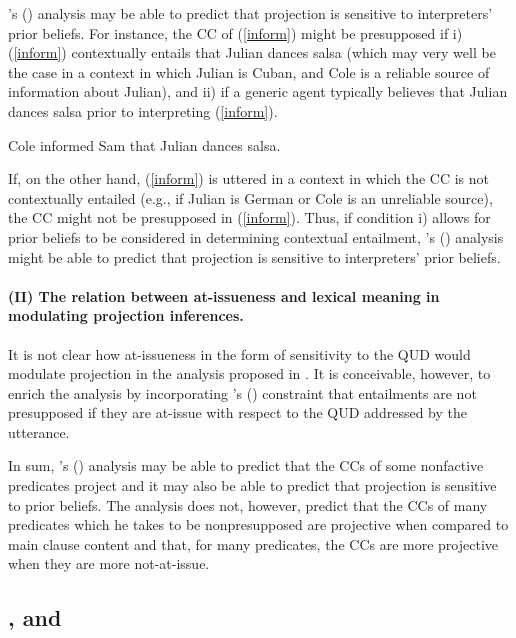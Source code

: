 \documentclass[11pt,fleqn]{article}
\newcommand{\6}{\mbox{$[\hspace*{-.6mm}[$}}
\newcommand{\9}{\mbox{$]\hspace*{-.6mm}]$}}
\newcommand{\citetpos}[1]{\citeauthor{#1}'s (\citeyear{#1})}
\begin{document}
\citetpos{schlenker2021} analysis may be able to predict that projection is sensitive to interpreters' prior beliefs. For instance, the CC of (\ref{inform}) might be presupposed if  i) (\ref{inform}) contextually entails that Julian dances salsa (which may very well be the case in a context in which Julian is Cuban, and Cole is a reliable source of information about Julian), and ii) if a generic agent typically believes that Julian dances salsa prior to interpreting (\ref{inform}). 

\begin{exe}
\ex\label{inform} Cole informed Sam that Julian dances salsa.
\end{exe}
If, on the other hand, (\ref{inform}) is uttered in a context in which the CC is not contextually entailed (e.g., if Julian is German or Cole is an unreliable source), the CC might not be presupposed in (\ref{inform}). Thus, if condition i) allows for prior beliefs to be considered in determining contextual entailment, \citetpos{schlenker2021} analysis might be able to predict that projection is sensitive to interpreters' prior beliefs. 


\paragraph{(II) The relation between at-issueness and lexical meaning in modulating projection inferences.} It is not clear how at-issueness in the form of sensitivity to the QUD would modulate projection in the analysis proposed in \cite{schlenker2021}. It is conceivable, however, to enrich the analysis by incorporating \citetpos{abrusan2011} constraint that entailments are not presupposed if they are at-issue with respect to the QUD addressed by the utterance.

\bigskip

In sum, \citetpos{schlenker2021} analysis may be able to predict that the CCs of some nonfactive predicates project and it may also be able to predict that projection is sensitive to prior beliefs. The analysis does not, however, predict that the CCs of many predicates which he takes to be nonpresupposed are projective when compared to main clause content and that, for many predicates, the CCs are more projective when they are more not-at-issue.

\subsection{\cite{qing-etal2016}, \cite{warstadt2022} and \cite{scontras-tonhauser2025}}
\end{document}

